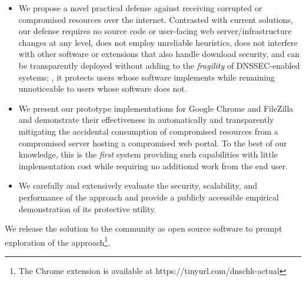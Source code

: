 \begin{itemize}

  \item We propose a novel practical defense against receiving corrupted or
  compromised resources over the internet. Contrasted with current solutions,
  our defense requires no source code or user-facing web server/infrastructure
  changes at any level, does not employ unreliable heuristics, does not
  interfere with other software or extensions that also handle download
  security, and can be transparently deployed without adding to the
  \textit{fragility} of DNSSEC-enabled systems; \ie, it protects users whose
  software implements \SYSTEM{} while remaining unnoticeable to users whose
  software does not.

  \item We present our prototype \SYSTEM{} implementations for Google Chrome and
  FileZilla and demonstrate their effectiveness in automatically and
  transparently mitigating the accidental consumption of compromised resources
  from a compromised server hosting a compromised web portal. To the best of our
  knowledge, this is the \emph{first} system providing such capabilities with
  little implementation cost while requiring no additional work from the end
  user.

  \item We carefully and extensively evaluate the security, scalability, and
  performance of the \SYSTEM{} approach and provide a publicly accessible
  empirical demonstration of its protective utility.

\end{itemize}

We release the \SYSTEM{} solution to the community as open source software to
prompt exploration of the \SYSTEM{} approach\footnote{The \SYSTEM{} Chrome
extension is available at https://tinyurl.com/dnschk-actual}.
